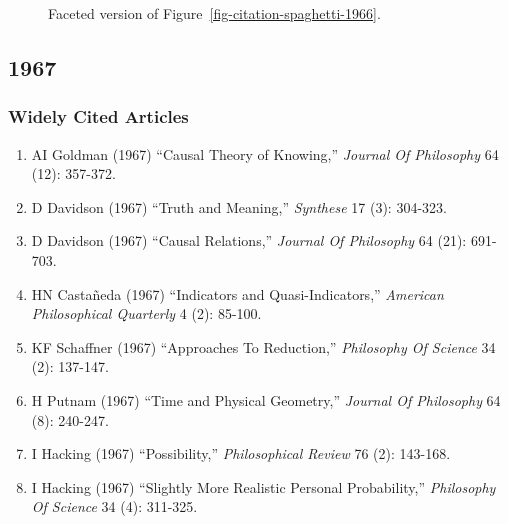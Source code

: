 \documentclass[
  10pt,
  letterpaper,
  DIV=11,
  numbers=noendperiod,
  twoside]{scrartcl}
\providecommand{\tightlist}{%
  \setlength{\itemsep}{0pt}\setlength{\parskip}{0pt}}\usepackage{longtable,booktabs,array}
\begin{document}
\begin{figure}


\caption{\label{fig-citation-facet-1966}Faceted version of
Figure~\ref{fig-citation-spaghetti-1966}.}

\end{figure}%

\newpage

\subsection{1967}\label{sec-s1967}

\subsubsection*{Widely Cited Articles}\label{widely-cited-articles-11}

\begin{enumerate}
\def\labelenumi{\arabic{enumi}.}
\tightlist
\item
  AI Goldman (1967) ``Causal Theory of Knowing,'' \emph{Journal Of
  Philosophy} 64 (12): 357-372.
\item
  D Davidson (1967) ``Truth and Meaning,'' \emph{Synthese} 17 (3):
  304-323.
\item
  D Davidson (1967) ``Causal Relations,'' \emph{Journal Of Philosophy}
  64 (21): 691-703.
\item
  HN Castañeda (1967) ``Indicators and Quasi-Indicators,''
  \emph{American Philosophical Quarterly} 4 (2): 85-100.
\item
  KF Schaffner (1967) ``Approaches To Reduction,'' \emph{Philosophy Of
  Science} 34 (2): 137-147.
\item
  H Putnam (1967) ``Time and Physical Geometry,'' \emph{Journal Of
  Philosophy} 64 (8): 240-247.
\item
  I Hacking (1967) ``Possibility,'' \emph{Philosophical Review} 76 (2):
  143-168.
\item
  I Hacking (1967) ``Slightly More Realistic Personal Probability,''
  \emph{Philosophy Of Science} 34 (4): 311-325.
\end{enumerate}
\end{document}
